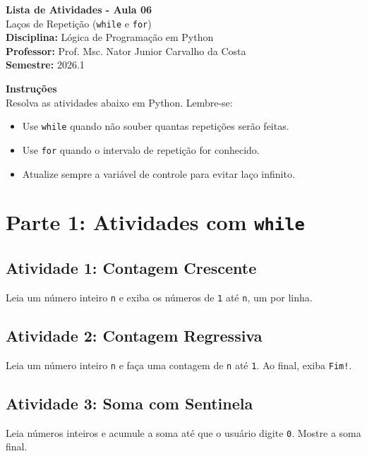 \documentclass[12pt]{article}
\begin{document}
\begin{center}
{\LARGE \textbf{Lista de Atividades - Aula 06}}\\[4pt]
{\large Laços de Repetição (\texttt{while} e \texttt{for})}\\[10pt]
\textbf{Disciplina:} Lógica de Programação em Python\\
\textbf{Professor:} Prof. Msc. Nator Junior Carvalho da Costa\\
\textbf{Semestre:} 2026.1
\end{center}

\vspace{8pt}
\colorbox{lightbg}{%
\parbox{\dimexpr\linewidth-2\fboxsep\relax}{%
\textbf{Instruções}\\
Resolva as atividades abaixo em Python. Lembre-se:
\begin{itemize}
    \item Use \texttt{while} quando não souber quantas repetições serão feitas.
    \item Use \texttt{for} quando o intervalo de repetição for conhecido.
    \item Atualize sempre a variável de controle para evitar laço infinito.
\end{itemize}
}}

\section*{Parte 1: Atividades com \texttt{while}}

\subsection*{Atividade 1: Contagem Crescente}
Leia um número inteiro \texttt{n} e exiba os números de \texttt{1} até \texttt{n}, um por linha.

\subsection*{Atividade 2: Contagem Regressiva}
Leia um número inteiro \texttt{n} e faça uma contagem de \texttt{n} até \texttt{1}. Ao final, exiba \texttt{Fim!}.

\subsection*{Atividade 3: Soma com Sentinela}
Leia números inteiros e acumule a soma até que o usuário digite \texttt{0}. Mostre a soma final.
\end{document}
